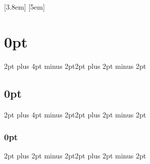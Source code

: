 \setlength\columnsep{5mm}
\setlength{\parindent}{0mm}
\setlength{\parskip}{1.5mm plus1mm minus1mm}

\setcounter{tocdepth}{2}
[3.8em]
{\vspace{-.3em}}
{\contentslabel{2.3em}}
{\hspace*{-2.3em}}
{\contentspage}
[5em]
{\vspace{-.3em}}
{\contentslabel{2.3em}}
{\hspace*{-2.3em}}
{\contentspage}

\titlespacing\section{0pt}{2pt plus 4pt minus 2pt}{2pt plus 2pt minus 2pt}
\titlespacing\subsection{0pt}{2pt plus 4pt minus 2pt}{2pt plus 2pt minus 2pt}
\titlespacing\subsubsection{0pt}{2pt plus 2pt minus 2pt}{2pt plus 2pt minus 2pt}

\pagestyle{fancy}
\lhead[]{}
\chead{}
\rhead[]{}
\rfoot[]{{\sffamily \textbf{\thepage}}}
\cfoot{}
\lfoot[{\sffamily \textbf{\thepage}}]{}
\renewcommand{\headrulewidth}{0.0pt}
\renewcommand{\footrulewidth}{0.0pt}

\fancypagestyle{plain}{
	\fancyhf{}
	\fancyfoot[LE,RO]{{\sffamily \thepage}}
	\renewcommand{\headrulewidth}{0pt}
	\renewcommand{\footrulewidth}{0.2pt}
}


\usepackage{amsmath}
\usepackage{amsfonts}
\usepackage{amssymb}
\usepackage{bm}

\newcommand{\fm}{\texttt{fastmat}}
\newcommand{\np}{\texttt{numpy}}
\newcommand{\scip}{\texttt{scipy}}

